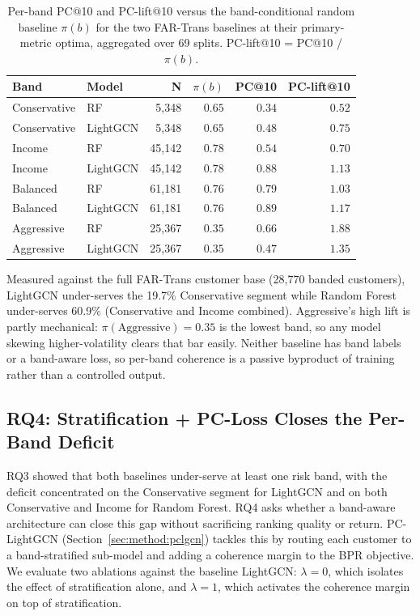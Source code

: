 \begin{table}[H]
\centering
\footnotesize
\setlength{\tabcolsep}{4pt}
\begin{tabular}{llrrrr}
\toprule
Band & Model & N & $\pi(b)$ & PC@10 & PC-lift@10 \\
\midrule
Conservative & RF       & 5{,}348  & $0.65$ & $0.34$ & $0.52$ \\
Conservative & LightGCN & 5{,}348  & $0.65$ & $0.48$ & $0.75$ \\
Income       & RF       & 45{,}142 & $0.78$ & $0.54$ & $0.70$ \\
Income       & LightGCN & 45{,}142 & $0.78$ & $0.88$ & $1.13$ \\
Balanced     & RF       & 61{,}181 & $0.76$ & $0.79$ & $1.03$ \\
Balanced     & LightGCN & 61{,}181 & $0.76$ & $0.89$ & $1.17$ \\
Aggressive   & RF       & 25{,}367 & $0.35$ & $0.66$ & $1.88$ \\
Aggressive   & LightGCN & 25{,}367 & $0.35$ & $0.47$ & $1.35$ \\
\bottomrule
\end{tabular}
\caption{Per-band PC@10 and PC-lift@10 versus the band-conditional random baseline $\pi(b)$ for the two FAR-Trans baselines at their primary-metric optima, aggregated over 69 splits. PC-lift@10 = PC@10 / $\pi(b)$.}
\label{tab:per-band-rq3}
\end{table}

Measured against the full FAR-Trans customer base (28{,}770 banded customers), LightGCN under-serves the 19.7\% Conservative segment while Random Forest under-serves 60.9\% (Conservative and Income combined). Aggressive's high lift is partly mechanical: $\pi(\text{Aggressive}) = 0.35$ is the lowest band, so any model skewing higher-volatility clears that bar easily. Neither baseline has band labels or a band-aware loss, so per-band coherence is a passive byproduct of training rather than a controlled output.

\subsection{RQ4: Stratification + PC-Loss Closes the Per-Band Deficit}
\label{sec:results:rq4}

RQ3 showed that both baselines under-serve at least one risk band, with the deficit concentrated on the Conservative segment for LightGCN and on both Conservative and Income for Random Forest. RQ4 asks whether a band-aware architecture can close this gap without sacrificing ranking quality or return. PC-LightGCN (Section~\ref{sec:method:pclgcn}) tackles this by routing each customer to a band-stratified sub-model and adding a coherence margin to the BPR objective. We evaluate two ablations against the baseline LightGCN: $\lambda = 0$, which isolates the effect of stratification alone, and $\lambda = 1$, which activates the coherence margin on top of stratification.

